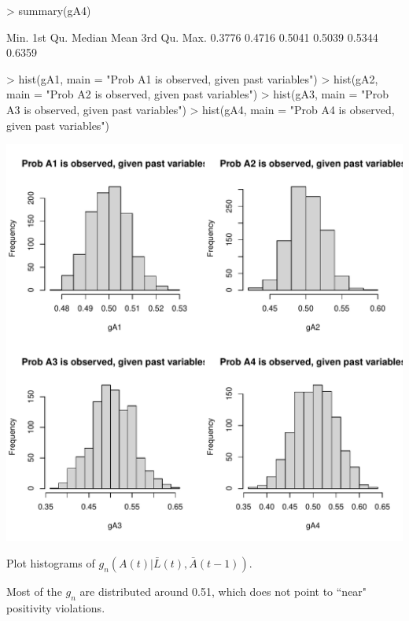 \documentclass{exam}
\newenvironment{myfigure}{\captionsetup{type=mytype}}{}
\begin{document}
\begin{enumerate}
\begin{solution}
\begin{Schunk}
\begin{Sinput}
> summary(gA4)
\end{Sinput}
\begin{Soutput}
   Min. 1st Qu.  Median    Mean 3rd Qu.    Max. 
 0.3776  0.4716  0.5041  0.5039  0.5344  0.6359 
\end{Soutput}
\begin{Sinput}
> hist(gA1, main = "Prob A1 is observed, given past variables")
> hist(gA2, main = "Prob A2 is observed, given past variables")
> hist(gA3, main = "Prob A3 is observed, given past variables")
> hist(gA4, main = "Prob A4 is observed, given past variables")
\end{Sinput}
\end{Schunk}
\begin{myfigure}
\begin{center}
\includegraphics[width=.4\textwidth]{gHist2.pdf}
\caption{Plot histograms of $g_n(A(t)|\bar{L}(t), \bar{A}(t-1))$. }
\label{Fig:gHist2}
\end{center}
\end{myfigure}

Most of the $g_n$ are distributed around 0.51, which does not point to ``near" positivity violations.


\end{solution}
\end{enumerate}
\end{document}
